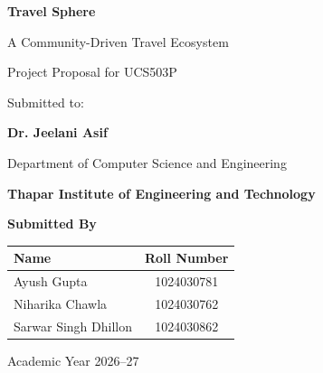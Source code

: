 \documentclass[12pt,a4paper]{article}
\begin{document}
\begin{titlepage}

\centering

\vspace*{1.2cm}

{\Huge\bfseries Travel Sphere\par}

\vspace{0.4cm}

{\Large A Community-Driven Travel Ecosystem\par}

\vspace{1.5cm}

{\Large Project Proposal for UCS503P\par}

\vspace{0.4cm}

{\large Submitted to:\par}

{\Large \textbf{Dr. Jeelani Asif}\par}

\vspace{0.4cm}

{\large Department of Computer Science and Engineering\par}

{\Large \textbf{Thapar Institute of Engineering and Technology}\par}

\vspace{1.5cm}

{\large\textbf{Submitted By}\par}

\vspace{0.6cm}

\renewcommand{\arraystretch}{1.5}

\begin{tabular}{|l|c|}
\hline
\textbf{Name} & \textbf{Roll Number} \\
\hline
Ayush Gupta & 1024030781 \\
\hline
Niharika Chawla & 1024030762 \\
\hline
Sarwar Singh Dhillon & 1024030862 \\
\hline
\end{tabular}
\vfill

{\large Academic Year 2026--27\par}

\vspace{0.2cm}



\end{titlepage}
\end{document}
